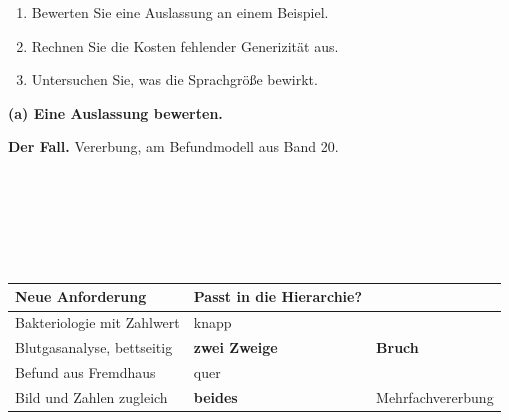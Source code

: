 \begin{merksatz}
\begin{warnung}
\begin{center}
\begin{minipage}{0.88\textwidth}
\end{minipage}
\end{center}
\end{warnung}
\end{merksatz}

\begin{aufgabe}
\begin{enumerate}[label=(\alph*)]
\item Bewerten Sie eine Auslassung an einem Beispiel.
\item Rechnen Sie die Kosten fehlender Generizität aus.
\item Untersuchen Sie, was die Sprachgröße bewirkt.
\end{enumerate}

\loesung
\textbf{(a) Eine Auslassung bewerten.}

\textbf{Der Fall.} Vererbung, am Befundmodell aus Band 20.

\begin{center}
\begin{minipage}{0.72\textwidth}
\\
\\
\\
\\
\\
\end{minipage}
\end{center}

\begin{center}
{\small
\renewcommand{\arraystretch}{1.45}
\begin{tabular}{@{}P{3.4cm}P{2.4cm}P{2.4cm}@{}}
\toprule
\textbf{Neue Anforderung} & \textbf{Passt in die Hierarchie?} & \\
\midrule
Bakteriologie mit Zahlwert & \textcolor{mittel}{knapp} & \\
Blutgasanalyse, bettseitig & \textcolor{akzent}{\textbf{zwei Zweige}} & \textcolor{akzent}{\textbf{Bruch}}\\
Befund aus Fremdhaus & \textcolor{akzent}{quer} & \\
Bild und Zahlen zugleich & \textcolor{akzent}{\textbf{beides}} & \textcolor{akzent}{Mehrfach\-vererbung}\\
\bottomrule
\end{tabular}}
\end{center}


\end{aufgabe}
